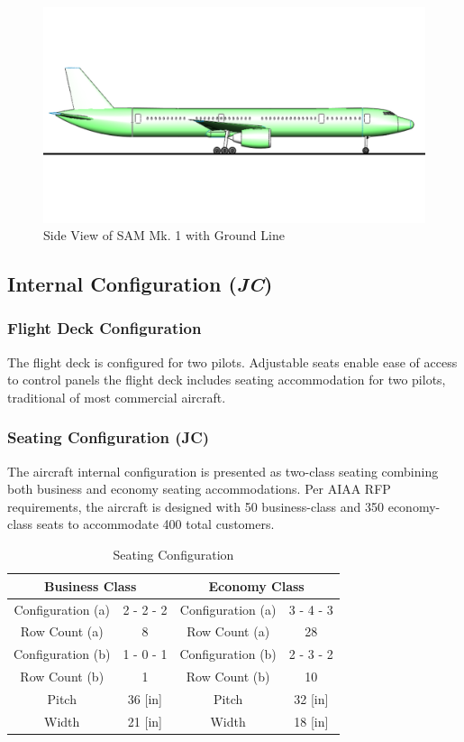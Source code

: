 \begin{figure}[!h]
    \centering
    \includegraphics[width=1.0\textwidth]{Photos/Ground_Line.pdf}
    \caption{Side View of SAM Mk. 1 with Ground Line}
    \label{grndline}
 \end{figure}

\subsection{Internal Configuration (\textit{JC})}
\label{section: internal config}
\subsubsection{Flight Deck Configuration}
The flight deck is configured for two pilots.  Adjustable seats enable ease of access to control panels the flight deck includes seating accommodation for two pilots, traditional of most commercial aircraft.  

\subsubsection{Seating Configuration (JC)}
The aircraft internal configuration is presented as two-class seating combining both business and economy seating accommodations.  Per AIAA RFP \cite{RFP} requirements, the aircraft is designed with 50 business-class and 350 economy-class seats to accommodate 400 total customers.  

\begin{table}[!h]
    \centering
    \caption{Seating Configuration}
    \begin{tabular}{|c|c||c|c|} \toprule
        \multicolumn{2}{c}{\textbf{Business Class}} & \multicolumn{2}{c}{\textbf{Economy Class}} \\ \hline
        Configuration (a) & 2 - 2 - 2 & Configuration (a) & 3 - 4 - 3 \\ \hline
        Row Count (a) & 8 & Row Count (a) & 28 \\ \hline
        Configuration (b) & 1 - 0 - 1 & Configuration (b) & 2 - 3 - 2 \\ \hline
        Row Count (b) & 1 & Row Count (b) & 10 \\ \hline
        Pitch & 36 [in] & Pitch & 32 [in] \\ \hline
        Width & 21 [in] & Width & 18 [in] \\ \bottomrule
    \end{tabular}
    \label{tab:seating}
\end{table}

